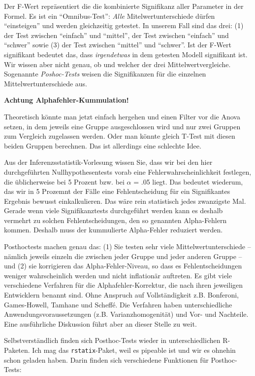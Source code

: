 \documentclass[
]{book}
\begin{document}
Der F-Wert repräsentiert die die kombinierte Signifikanz aller Parameter in der Formel. Es ist ein ``Omnibus-Test'': \emph{Alle} Mitelwertunterschiede dürfen ``einsteigen'' und werden gleichzeitig getestet. In unserem Fall sind das drei: (1) der Test zwischen ``einfach'' und ``mittel'', der Test zwischen ``einfach'' und ``schwer'' sowie (3) der Test zwischen ``mittel'' und ``schwer''. Ist der F-Wert signifikant bedeutet das, dass \emph{irgendetwas} in dem getesten Modell signifikant ist. Wir wissen aber nicht genau, ob und welcher der drei Mittelwertvergleiche. Sogenannte \emph{Poshoc-Tests} weisen die Signifikanzen für die einzelnen Mittelwertunterschiede aus.

\leavevmode\hypertarget{info_levenef}{}%
\textbf{Achtung Alphafehler-Kummulation!}

Theoretisch könnte man jetzt einfach hergehen und einen Filter vor die Anova setzen, in dem jeweils eine Gruppe ausgeschlossen wird und nur zwei Gruppen zum Vergleich zugelassen werden. Oder man könnte gleich T-Test mit diesen beiden Gruppen berechnen. Das ist allerdings eine schlechte Idee.

Aus der Inferenzsstatistik-Vorlesung wissen Sie, dass wir bei den hier durchgeführten Nullhypothesentests vorab eine Fehlerwahrscheinlichkeit festlegen, die üblicherweise bei 5 Prozent bzw. bei \(\alpha\) = .05 liegt. Das bedeutet wiederum, das wir in 5 Prozemnt der Fälle eine Fehlentscheidung für ein Signifikantes Ergebnis bewusst einkalkulieren. Das wäre rein statistisch jedes zwanzigste Mal. Gerade wenn viele Signifikanztests durchgeführt werden kann es deshalb vermehrt zu solchen Fehlentscheidungen, den so genannten Alpha-Fehlern kommen. Deshalb muss der kummulierte Alpha-Fehler reduziert werden.

Posthoctests machen genau das: (1) Sie testen sehr viele Mittelwertunterschiede -- nämlich jeweils einzeln die zwischen jeder Gruppe und jeder anderen Gruppe -- und (2) sie korrigieren das Alpha-Fehler-Niveau, so dass es Fehlentscheidungen weniger wahrscheinlich werden und nicht inflationär auftreten. Es gibt viele verschiedene Verfahren für die Alphafehler-Korrektur, die nach ihren jeweiligen Entwicklern benannt sind. Ohne Anspruch auf Vollständigkeit z.B. Bonferoni, Games-Howell, Tamhane und Scheffé. Die Verfahren haben unterschiedliche Anwendungsvoraussetzungen (z.B. Varianzhomogenität) und Vor- und Nachteile. Eine ausführliche Diskussion führt aber an dieser Stelle zu weit.

Selbstverständlich finden sich Posthoc-Tests wieder in unterschiedlichen R-Paketen. Ich mag das \texttt{rstatix}-Paket, weil es pipeable ist und wir es ohnehin schon geladen haben. Darin finden sich verschiedene Funktionen für Posthoc-Tests:
\end{document}
